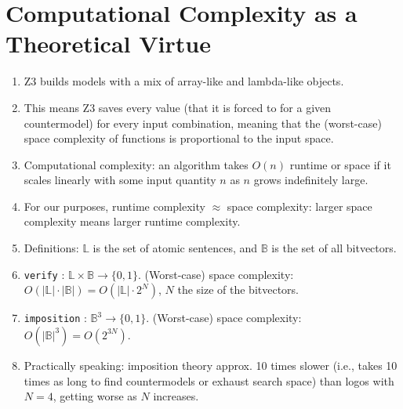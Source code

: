 \documentclass[a4paper, 11pt]{article} %
\theoremstyle{Pthm}
\newcommand{\set}[1]{\lbrace#1\rbrace} %
\newcommand{\abs}[1]{|#1|} %
\begin{document}
\section*{Computational Complexity as a Theoretical Virtue}%

\begin{enumerate}[leftmargin=.25in]
	\item Z3 builds models with a mix of array-like and lambda-like objects.
	\item This means Z3 saves every value (that it is forced to for a given countermodel) for every input combination, meaning that the (worst-case) space complexity of functions is proportional to the input space. 
	\item Computational complexity: an algorithm takes $O(n)$ runtime or space if it scales linearly with some input quantity $n$ as $n$ grows indefinitely large. 
	\item For our purposes, runtime complexity $\approx$ space complexity: larger space complexity means larger runtime complexity. 
	\item Definitions: $\mathbb{L}$ is the set of atomic sentences, and $\mathbb{B}$ is the set of all bitvectors. 
	\item \texttt{verify} : $\mathbb{L} \times \mathbb{B} \to \set{0,1}$. (Worst-case) space complexity: $O(\abs{\mathbb{L}} \cdot \abs{\mathbb{B}}) = O(\abs{\mathbb{L}} \cdot 2^N)$, $N$ the size of the bitvectors.
	\item \texttt{imposition} : $\mathbb{B}^3 \to \set{0,1}$. (Worst-case) space complexity: $O(\abs{\mathbb{B}}^3) = O(2^{3N})$.
	\item Practically speaking: imposition theory approx. 10 times slower (i.e., takes 10 times as long to find countermodels or exhaust search space) than logos with $N=4$, getting worse as $N$ increases. 

\end{enumerate}
\end{document}
